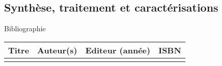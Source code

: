 \begin{headerBlock}
\chapter{Synthèse, traitement et caractérisations}
\label{LC_SyntheseTraitement}
 \end{headerBlock}



\begin{reportBlock}{Bibliographie}

\begin{center}
\begin{tabularx}{\textwidth}{| X | X | c | c |}\hline
Titre & Auteur(s) & Editeur (année) & ISBN \\ \hline
 &  &  &  \\ 
 \hline
\end{tabularx}
\end{center}

\end{reportBlock}

